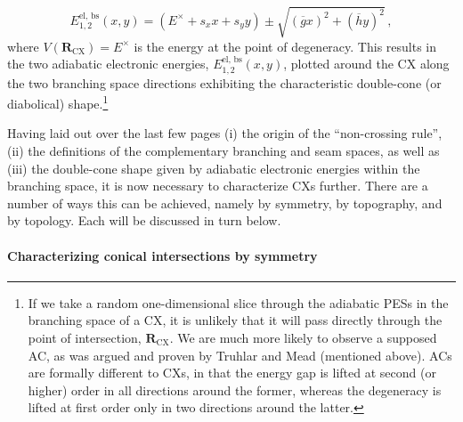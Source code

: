\documentclass[9pt,bestpractices]{livecoms}
\newcommand{\R}{\mathbf{R}}
\begin{document}
\begin{equation}
\label{adia_elec_eigenval_bs}
    E_{1,2}^{\text{el, bs}}(x,y) = \left(E^\times + s_x x + s_y y\right) \pm \sqrt{\left(\overline{g}x\right)^2 + \left(\overline{h}y\right)^2} \, ,
\end{equation}
where $V(\R_{\text{CX}}) = E^\times$ is the energy at the point of degeneracy.\cite{sicilia2007quadratic, fdez_galvan_analytical_2016}
This results in the two adiabatic electronic energies, $E_{1,2}^{\text{el, bs}}(x,y)$, plotted around the CX along the two branching space directions exhibiting the characteristic double-cone (or diabolical)\cite{yarkony_diabolical_1996, yarkony_conical_1998} shape.\footnote{
If we take a random one-dimensional slice through the adiabatic PESs in the branching space of a CX, it is unlikely that it will pass directly through the point of intersection, $\R_\text{CX}$. 
We are much more likely to observe a supposed AC, as was argued and proven by Truhlar and Mead (mentioned above).\cite{truhlar_relative_2003}
ACs are formally different to CXs, in that the energy gap is lifted at second (or higher) order in all directions around the former, whereas the degeneracy is lifted at first order only in two directions around the latter.\cite{levine2007isomerization}
}

Having laid out over the last few pages (i) the origin of the “non-crossing rule”, (ii) the definitions of the complementary branching and seam spaces, as well as (iii) the double-cone shape given by adiabatic electronic energies within the branching space, it is now necessary to characterize CXs further. 
There are a number of ways this can be achieved, namely by symmetry, by topography, and by topology. 
Each will be discussed in turn below.

\paragraph{Characterizing conical intersections by symmetry}
\label{ch2_sym}
\end{document}
